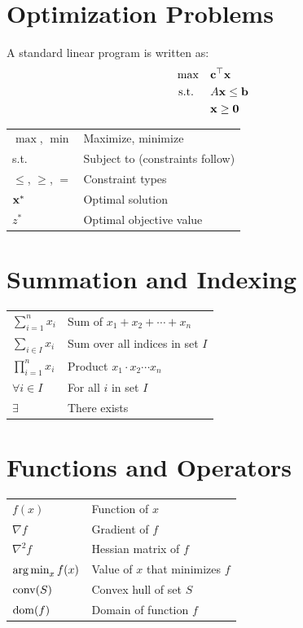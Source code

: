 \section*{Optimization Problems}

A standard linear program is written as:
\[
\begin{split}
\max \quad & \mathbf{c}^\top \mathbf{x} \\
\mbox{ s.t. } \quad & A\mathbf{x} \leq \mathbf{b} \\
& \mathbf{x} \geq \mathbf{0}
\end{split}
\]

\begin{tabular}{@{}ll@{}}
$\max$, $\min$ & Maximize, minimize \\
s.t. & Subject to (constraints follow) \\
$\leq$, $\geq$, $=$ & Constraint types \\
$\mathbf{x}^*$ & Optimal solution \\
$z^*$ & Optimal objective value \\
\end{tabular}

\section*{Summation and Indexing}

\begin{tabular}{@{}ll@{}}
$\sum_{i=1}^{n} x_i$ & Sum of $x_1 + x_2 + \cdots + x_n$ \\
$\sum_{i \in I} x_i$ & Sum over all indices in set $I$ \\
$\prod_{i=1}^{n} x_i$ & Product $x_1 \cdot x_2 \cdots x_n$ \\
$\forall i \in I$ & For all $i$ in set $I$ \\
$\exists$ & There exists \\
\end{tabular}

\section*{Functions and Operators}

\begin{tabular}{@{}ll@{}}
$f(x)$ & Function of $x$ \\
$\nabla f$ & Gradient of $f$ \\
$\nabla^2 f$ & Hessian matrix of $f$ \\
$\operatorname{arg\,min}_x f(x)$ & Value of $x$ that minimizes $f$ \\
$\textup{conv}(S)$ & Convex hull of set $S$ \\
$\operatorname{dom}(f)$ & Domain of function $f$ \\
\end{tabular}

